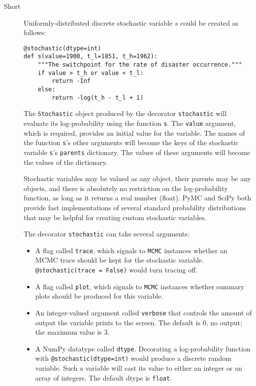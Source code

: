 \begin{description}
    
    \item[Short] Uniformly-distributed discrete stochastic variable $s$ could be created as follows:
    \begin{verbatim}
@stochastic(dtype=int)
def s(value=1900, t_l=1851, t_h=1962):
    """The switchpoint for the rate of disaster occurrence."""
    if value > t_h or value < t_l:
        return -Inf
    else:
        return -log(t_h - t_l + 1) 
    \end{verbatim}
    The \texttt{Stochastic} object produced by the decorator \texttt{stochastic} will evaluate its log-probability using the function \texttt{s}. The \texttt{value} argument, which is required, provides an initial value for the variable. The names of the function \texttt{s}'s other arguments will become the keys of the stochastic variable \texttt{s}'s \texttt{parents} dictionary. The values of these arguments will become the values of the dictionary.

Stochastic variables may be valued as any object, their parents may be any objects, and there is absolutely no restriction on the log-probability function, as long as it returns a real number (float). PyMC and SciPy both provide fast implementations of several standard probability distributions that may be helpful for creating custom stochastic variables.

    The decorator \texttt{stochastic} can take several arguments: 
    \begin{itemize}
        \item A flag called \texttt{trace}, which signals to \texttt{MCMC} instances whether an MCMC trace should be kept for the stochastic variable. \texttt{@stochastic(trace = False)} would turn tracing off.
        \item A flag called \texttt{plot}, which signals to \texttt{MCMC} instances whether summary plots should be produced for this variable.
        \item An integer-valued argument called \texttt{verbose} that controls the amount of output the variable prints to the screen. The default is $0$, no output; the maximum value is 3. 
        \item A NumPy datatype called \texttt{dtype}. Decorating a log-probability function with \texttt{@stochastic(dtype=int)} would produce a discrete random variable. Such a variable will cast its value to either an integer or an array of integers. The default dtype is \texttt{float}.
    \end{itemize} 
    


\end{description}
